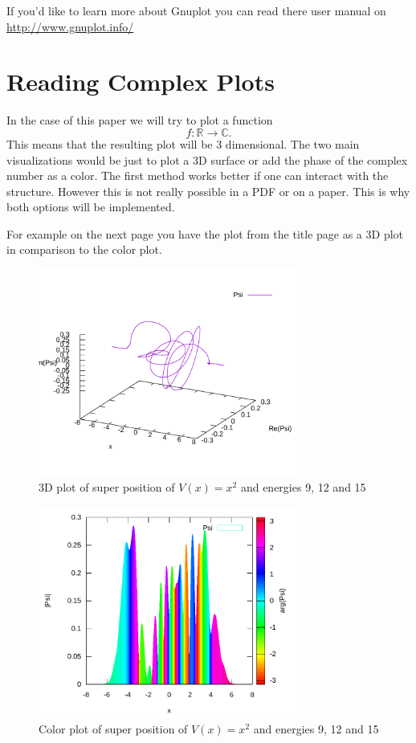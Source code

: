 \documentclass[11pt,DIV=10,final]{scrreprt} %
\begin{document}
If you'd like to learn more about Gnuplot you can read there user manual on \url{http://www.gnuplot.info/}

\section{Reading Complex Plots}\label{sec:complex-color-plots}
In the case of this paper we will try to plot a function
\[
  f: \mathbb{R} \to \mathbb{C}.
\]
This means that the resulting plot will be 3 dimensional. The two main visualizations would be just to plot a 3D surface or add the phase of the complex number as a color.
The first method works better if one can interact with the structure. However this is not really possible in a PDF or on a paper. This is why both options will be implemented.

For example on the next page you have the plot from the title page as a 3D plot in comparison to the color plot.
\pagebreak[4]
\begin{figure}[H]
  \centering
  \includegraphics[width=0.76\textwidth]{plots/super-square-9-12-15-3d.pdf}
  \caption{3D plot of super position of $V(x) = x^2$ and energies 9, 12 and 15}
\end{figure}
\begin{figure}[H]
  \centering
  \includegraphics[width=0.775\textwidth]{plots/super-square-9-12-15-color.pdf}
  \caption{Color plot of super position of $V(x) = x^2$ and energies 9, 12 and 15}
\end{figure}
\end{document}
